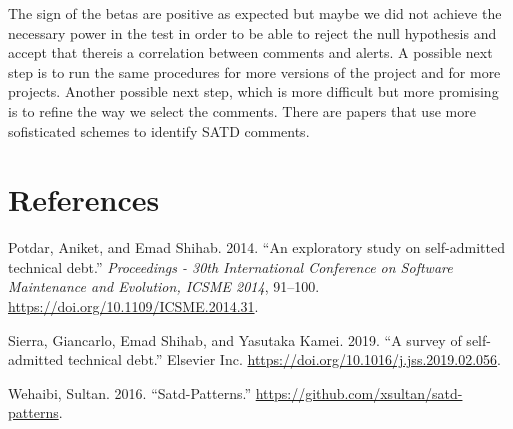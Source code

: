 \documentclass[
]{article}
\begin{document}
\normalsize

The sign of the betas are positive as expected but maybe we did not achieve the necessary power in the test in order to be able to reject the null hypothesis and accept that thereis a correlation between comments and alerts. A possible next step is to run the same procedures for more versions of the project and for more projects. Another possible next step, which is more difficult but more promising is to refine the way we select the comments. There are papers that
use more sofisticated schemes to identify SATD comments. 

\section{References}

\hypertarget{refs}{}
\leavevmode\hypertarget{ref-Potdar2014}{}%
Potdar, Aniket, and Emad Shihab. 2014. ``An exploratory study on
self-admitted technical debt.'' \emph{Proceedings - 30th International
Conference on Software Maintenance and Evolution, ICSME 2014}, 91--100.
\url{https://doi.org/10.1109/ICSME.2014.31}.

\leavevmode\hypertarget{ref-Sierra2019}{}%
Sierra, Giancarlo, Emad Shihab, and Yasutaka Kamei. 2019. ``A survey of
self-admitted technical debt.'' Elsevier Inc.
\url{https://doi.org/10.1016/j.jss.2019.02.056}.

\leavevmode\hypertarget{ref-Wehaibi2016}{}%
Wehaibi, Sultan. 2016. ``Satd-Patterns.''
\url{https://github.com/xsultan/satd-patterns}.
\end{document}
